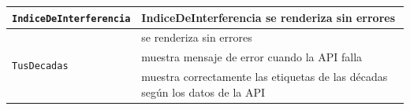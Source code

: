 \begin{longtable}{|p{5cm}|p{9cm}|}
    \multirow{1}{*}{\texttt{IndiceDeInterferencia}} & IndiceDeInterferencia se renderiza sin errores                               \\ \hline

    \multirow{3}{*}{\texttt{TusDecadas}}            & se renderiza sin errores                                                     \\ \cline{2-2}
                                                    & muestra mensaje de error cuando la API falla                                 \\ \cline{2-2}
                                                    & muestra correctamente las etiquetas de las décadas según los datos de la API \\ \hline
\end{longtable}







